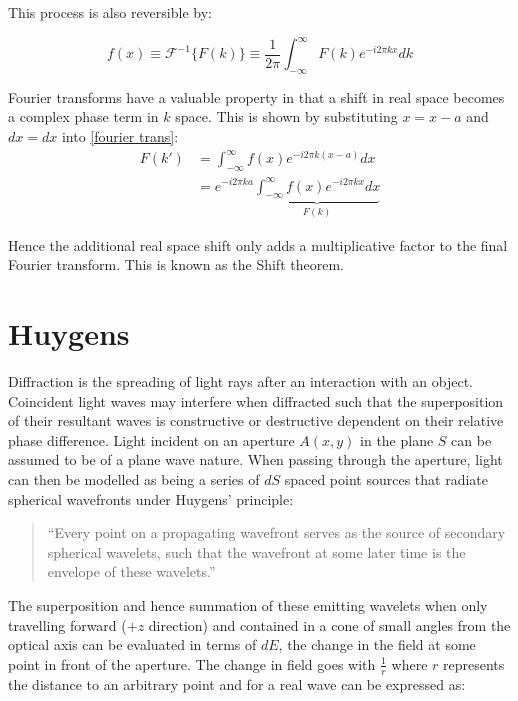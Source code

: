 This process is also reversible by:

\begin{equation}
f(x) \equiv\mathcal{F}^{-1}  \{F(k)\} \equiv \frac{1}{2 \pi} \int_{-\infty}^{\infty}F(k) e^{-i2 \pi kx} dk
\end{equation}


Fourier transforms have a valuable property in that a shift in real space becomes a complex phase term in $k$ space. This is shown by substituting $x = x-a$ and $dx = dx$ into \eqref{fourier trans}:
\begin{align}
F(k') &=  \int_{-\infty}^{\infty}f(x) e^{-i2 \pi k(x-a)} dx \nonumber\\
&=  e^{-i2 \pi ka} \underbrace{\int_{-\infty}^{\infty}f(x) e^{-i2 \pi kx}dx}_{F(k)}   \label{shift_ivariance}
\end{align}

Hence the additional real space shift only adds a multiplicative factor to the final Fourier transform. This is known as the Shift theorem.

\section{Huygens}


Diffraction is the spreading of light rays after an interaction with an object. Coincident light waves may interfere when diffracted such that the superposition of their resultant waves is constructive or destructive dependent on their relative phase difference. Light incident on an aperture $A(x,y)$ in the plane $S$ can be assumed to be of a plane wave nature. When passing through the aperture, light can then be modelled as being a series of $dS$ spaced point sources that radiate spherical wavefronts under Huygens' principle:

\begin{quote}
``Every point on a propagating wavefront serves as the source of secondary spherical wavelets, such that the wavefront at some later time is the envelope of these wavelets.'' \cite{Goodman2005}
\end{quote}

%

The superposition and hence summation of these emitting wavelets when only travelling forward ($+z$ direction) and contained in a cone of small angles from the optical axis can be evaluated in terms of $dE$, the change in the field at some point in front of the aperture. The change in field goes with $\frac{1}{r}$ where $r$ represents the distance to an arbitrary point and for a real wave can be expressed as:

